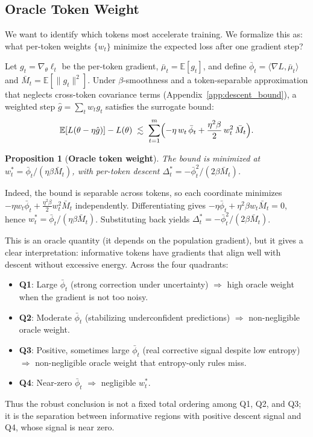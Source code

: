 \documentclass{article}
\newtheorem{proposition}[theorem]{Proposition}
\newcommand{\EE}{\mathbb{E}}
\begin{document}
\subsection{Oracle Token Weight}

We want to identify which tokens most accelerate training.
We formalize this as: what per-token weights $\{w_t\}$ minimize the expected loss after one gradient step?

Let $g_t = \nabla_\theta \ell_t$ be the per-token gradient, $\bar\mu_t = \EE[g_t]$, and define
$\bar\phi_t = \langle \nabla L, \bar\mu_t \rangle$ and $\bar M_t = \EE[\|g_t\|^2]$.
Under $\beta$-smoothness and a token-separable approximation that neglects cross-token covariance terms (Appendix~\ref{app:descent_bound}), a weighted step $\hat g = \sum_t w_t g_t$ satisfies the surrogate bound:
\begin{equation}
    \EE[L(\theta - \eta\hat{g})] - L(\theta)
    \;\lesssim\;
    \sum_{t=1}^{m} \Bigl(-\eta\, w_t\, \bar\phi_t + \frac{\eta^2\beta}{2}\, w_t^2\, \bar M_t\Bigr).
    \label{eq:descent_bound_main}
\end{equation}

\begin{proposition}[\textbf{Oracle token weight}]
\label{prop:optimal_weight}
The bound is minimized at $w_t^* = \bar\phi_t / (\eta\beta\bar M_t)$,
with per-token descent $\Delta_t^* = -\bar\phi_t^2 / (2\beta\bar M_t)$.
\end{proposition}

Indeed, the bound is separable across tokens, so each coordinate minimizes
$-\eta w_t \bar\phi_t + \frac{\eta^2\beta}{2} w_t^2 \bar M_t$ independently. Differentiating gives
$-\eta \bar\phi_t + \eta^2\beta w_t \bar M_t = 0$, hence
$w_t^* = \bar\phi_t / (\eta\beta\bar M_t)$. Substituting back yields
$\Delta_t^* = -\bar\phi_t^2 / (2\beta\bar M_t)$.

This is an oracle quantity (it depends on the population gradient), but it gives a clear interpretation: informative tokens have gradients that align well with descent without excessive energy.
Across the four quadrants:
\begin{itemize}
    \item \textbf{Q1}: Large $\bar\phi_t$ (strong correction under uncertainty) $\Rightarrow$ high oracle weight when the gradient is not too noisy.
    \item \textbf{Q2}: Moderate $\bar\phi_t$ (stabilizing underconfident predictions) $\Rightarrow$ non-negligible oracle weight.
    \item \textbf{Q3}: Positive, sometimes large $\bar\phi_t$ (real corrective signal despite low entropy) $\Rightarrow$ non-negligible oracle weight that entropy-only rules miss.
    \item \textbf{Q4}: Near-zero $\bar\phi_t$ $\Rightarrow$ negligible $w_t^*$.
\end{itemize}
Thus the robust conclusion is not a fixed total ordering among Q1, Q2, and Q3; it is the separation between informative regions with positive descent signal and Q4, whose signal is near zero.
\end{document}
